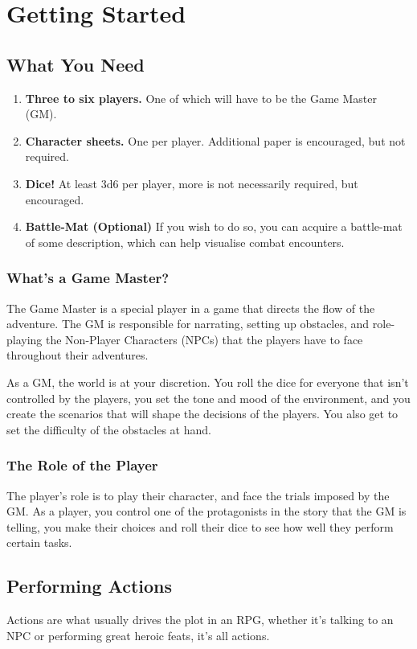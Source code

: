 \chapter{Getting Started}
\section{What You Need}
\begin{enumerate}[font = \bfseries]
    \item \textbf{Three to six players.} One of which will have to be the Game Master (GM).
    \item \textbf{Character sheets.} One per player. 
    Additional paper is encouraged, but not required.
    \item \textbf{Dice!} At least 3d6 per player, more is not necessarily required, but encouraged.
    \item \textbf{Battle-Mat (Optional)} If you wish to do so, you can acquire a battle-mat of some description, which can help visualise combat encounters.
\end{enumerate}

\subsection{What's a Game Master?}
The Game Master is a special player in a game that directs the flow of the adventure.
The GM is responsible for narrating, setting up obstacles, and role-playing the Non-Player Characters (NPCs) that the players have to face throughout their adventures.

As a GM, the world is at your discretion. 
You roll the dice for everyone that isn't controlled by the players, you set the tone and mood of the environment, and you create the scenarios that will shape the decisions of the players.
You also get to set the difficulty of the obstacles at hand.

\subsection{The Role of the Player}
The player's role is to play their character, and face the trials imposed by the GM.
As a player, you control one of the protagonists in the story that the GM is telling, you make their choices and roll their dice to see how well they perform certain tasks.

\section{Performing Actions}
Actions are what usually drives the plot in an RPG, whether it's talking to an NPC or performing great heroic feats, it's all actions.

